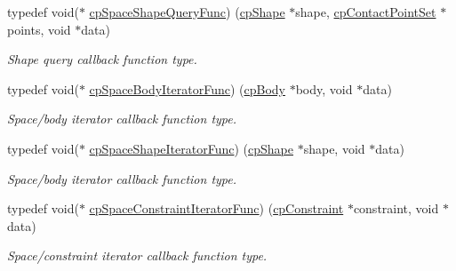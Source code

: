 \begin{DoxyCompactItemize}
\mbox{\label{group__cp_space_gab124952dd71dea36688f6ff6ff8bdcb2}} 
typedef void($\ast$ \mbox{\hyperlink{group__cp_space_gab124952dd71dea36688f6ff6ff8bdcb2}{cp\+Space\+Shape\+Query\+Func}}) (\mbox{\hyperlink{structcp_shape}{cp\+Shape}} $\ast$shape, \mbox{\hyperlink{structcp_contact_point_set}{cp\+Contact\+Point\+Set}} $\ast$points, void $\ast$data)
\begin{DoxyCompactList}\small\item\em Shape query callback function type. \end{DoxyCompactList}\item 
\mbox{\label{group__cp_space_ga2870b1128c5bfe79cb261d269abdea64}} 
typedef void($\ast$ \mbox{\hyperlink{group__cp_space_ga2870b1128c5bfe79cb261d269abdea64}{cp\+Space\+Body\+Iterator\+Func}}) (\mbox{\hyperlink{structcp_body}{cp\+Body}} $\ast$body, void $\ast$data)
\begin{DoxyCompactList}\small\item\em Space/body iterator callback function type. \end{DoxyCompactList}\item 
\mbox{\label{group__cp_space_gafae017c9a8a7c082032035bf165e4ec9}} 
typedef void($\ast$ \mbox{\hyperlink{group__cp_space_gafae017c9a8a7c082032035bf165e4ec9}{cp\+Space\+Shape\+Iterator\+Func}}) (\mbox{\hyperlink{structcp_shape}{cp\+Shape}} $\ast$shape, void $\ast$data)
\begin{DoxyCompactList}\small\item\em Space/body iterator callback function type. \end{DoxyCompactList}\item 
\mbox{\label{group__cp_space_ga0bf20ed2411342352dc43b71c60649c1}} 
typedef void($\ast$ \mbox{\hyperlink{group__cp_space_ga0bf20ed2411342352dc43b71c60649c1}{cp\+Space\+Constraint\+Iterator\+Func}}) (\mbox{\hyperlink{structcp_constraint}{cp\+Constraint}} $\ast$constraint, void $\ast$data)
\begin{DoxyCompactList}\small\item\em Space/constraint iterator callback function type. \end{DoxyCompactList}\item 
\mbox{\label{group__cp_space_gafc46fcefca8c28112ca8245eef00bae7}} 

\end{DoxyCompactItemize}
